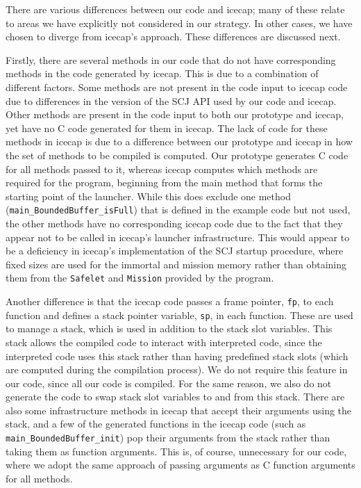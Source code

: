 {There are various differences between our code and icecap; many
of these relate to areas we have explicitly not considered in our
strategy.
In other cases, we have chosen to diverge from icecap's approach.
These differences are discussed next.

Firstly, there are several methods in our code that do not have
corresponding methods in the code generated by icecap.
This is due to a combination of different factors.
Some methods are not present in the code input to icecap code due to
differences in the version of the SCJ API used by our code and icecap.
Other methods are present in the code input to both our prototype and
icecap, yet have no C code generated for them in icecap.
The lack of code for these methods in icecap is due to a difference
between our prototype and icecap in how the set of methods to be
compiled is computed.
Our prototype generates C code for all methods passed to it, whereas
icecap computes which methods are required for the program, beginning
from the main method that forms the starting point of the launcher.
While this does exclude one method
(\texttt{main\_BoundedBuffer\_isFull}) that is defined in the example
code but not used, the other methods have no corresponding icecap code
due to the fact that they appear not to be called in icecap's launcher
infrastructure.
This would appear to be a deficiency in icecap's implementation of the
SCJ startup procedure, where fixed sizes are used for the immortal and
mission memory rather than obtaining them from the \texttt{Safelet}
and \texttt{Mission} provided by the program.

Another difference is that the icecap code passes a frame pointer,
\texttt{fp}, to each function and defines a stack pointer variable,
\texttt{sp}, in each function.
These are used to manage a stack, which is used in addition to the
stack slot variables.
This stack allows the compiled code to interact with interpreted code,
since the interpreted code uses this stack rather than having
predefined stack slots (which are computed during the compilation
process).
We do not require this feature in our code, since all our code is
compiled.
For the same reason, we also do not generate the code to swap stack
slot variables to and from this stack.
There are also some infrastructure methods in icecap that accept their
arguments using the stack, and a few of the generated functions in the
icecap code (such as \texttt{main\_BoundedBuffer\_init}) pop their
arguments from the stack rather than taking them as function
arguments.
This is, of course, unnecessary for our code, where we adopt the same
approach of passing arguments as C function arguments for all methods.

}
